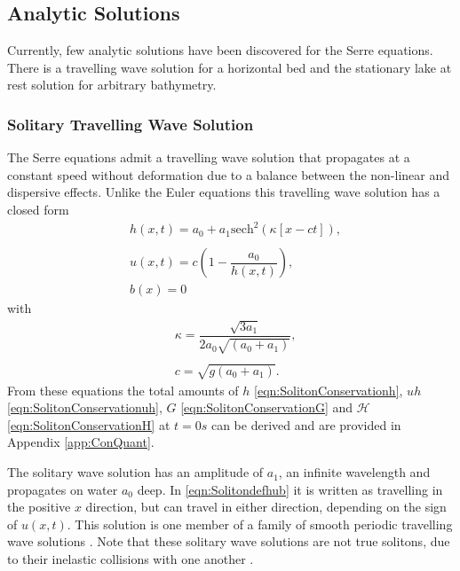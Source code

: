 \subsection{Analytic Solutions}
Currently, few analytic solutions have been discovered for the Serre equations. There is a travelling wave solution for a horizontal bed \cite{El-etal-2006} and the stationary lake at rest solution for arbitrary bathymetry.


\subsubsection{Solitary Travelling Wave Solution}
The Serre equations admit a travelling wave solution that propagates at a constant speed without deformation due to a balance between the non-linear and dispersive effects. Unlike the Euler equations this travelling wave solution has a closed form
\begin{subequations}
	\begin{align}
	&h(x,t) = a_0 + a_1\text{sech}^2\left(\kappa \left[x - ct\right]\right), \\  \nonumber \\
	&u(x,t) = c\left(1 - \dfrac{a_0}{h(x,t)}\right), \\
	&b(x) = 0
	\end{align}
	\label{eqn:Solitondefhub}
\end{subequations}
with
\begin{align*}
&\kappa = \dfrac{\sqrt{3a_1}}{2 a_0\sqrt{\left(a_0 + a_1\right)}}, \\ \\
&c = \sqrt{g(a_0 + a_1)}.
\end{align*}
From these equations the total amounts of $h$ \eqref{eqn:SolitonConservationh}, $uh$ \eqref{eqn:SolitonConservationuh}, $G$ \eqref{eqn:SolitonConservationG} and $\mathcal{H}$ \eqref{eqn:SolitonConservationH} at $t=0s$ can be derived and are provided in Appendix \ref{app:ConQuant}.

The solitary wave solution has an amplitude of $a_1$, an infinite wavelength and propagates on water $a_0$ deep. In \eqref{eqn:Solitondefhub} it is written as travelling in the positive $x$ direction, but can travel in either direction, depending on the sign of $u(x,t)$. This solution is one member of a family of smooth periodic travelling wave solutions \cite{El-etal-2006}. Note that these solitary wave solutions are not true solitons, due to their inelastic collisions with one another \cite{Dutykh-etal-2013-761}. 

